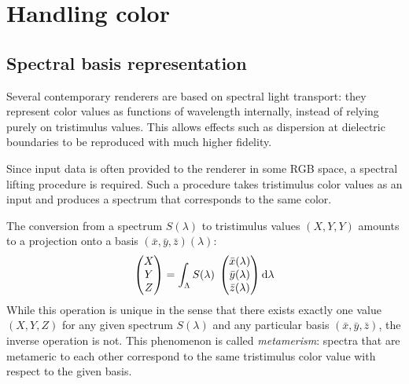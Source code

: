 
\chapter{Handling color}\label{ch:color}

\section{Spectral basis representation}
\label{sec:spec_basis}

Several contemporary renderers are based on spectral light transport: 
they represent color values as functions of wavelength
internally, instead of relying purely on tristimulus values.
This allows effects such as dispersion at dielectric boundaries 
to be reproduced with much higher fidelity.

Since input data is often provided to the renderer in some \gls{RGB} space,
a spectral lifting procedure is required. Such a procedure takes
tristimulus color values as an input and produces a spectrum that
corresponds to the same color.

The conversion from a spectrum $S(\lambda)$ to tristimulus values 
$(X, Y, Y)$ amounts to a projection onto a basis $(\bar x, \bar y, \bar z)(\lambda)$:
\begin{equation}
    \begin{pmatrix}X\\Y\\Z\end{pmatrix}
        = \int_\Lambda S(\lambda)\; 
    \begin{pmatrix}
        \bar x(\lambda)\\
        \bar y(\lambda)\\
        \bar z(\lambda)
    \end{pmatrix}
    \mathop{}\!\mathrm{d}\lambda
    \label{eqn:color_matching}
\end{equation}
While this operation is unique in the sense that there exists exactly one
value $(X,Y,Z)$ for any given spectrum $S(\lambda)$ and any particular basis
$(\bar x,\bar y, \bar z)$, the inverse operation is not. This phenomenon is called
\emph{metamerism}: spectra that are metameric to each other correspond to the
same tristimulus color value with respect to the given basis.

